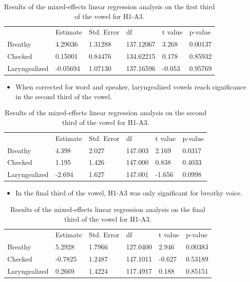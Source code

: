 \documentclass[12pt, letterpaper]{article}
\providecommand{\lsptoprule}{\midrule\toprule}
\providecommand{\lspbottomrule}{\bottomrule\midrule}
\begin{document}
\begin{table}[!h]
	\centering
	\caption{Results of the mixed-effects linear regression analysis on the first third of the vowel for H1-A3. }
	\label{tab:H1A3_First}
	 \begin{tabular}{llllll}
	  \lsptoprule
						&  Estimate  & Std. Error & df & t value & p-value \\
	  	Breathy   		&  4.29036  &  1.31288 & 137.12067 &  3.268  &  0.00137\\
		Checked    		&  0.15001  &  0.84476 & 134.62215 &  0.178  &  0.85932 \\
		Laryngealized	& -0.05694  &  1.07130 & 137.16596 & -0.053  &  0.95769\\
	  \lspbottomrule
	 \end{tabular}
\end{table}

\begin{itemize}
	\item When corrected for word and speaker, laryngealized vowels reach significance in the second third of the vowel. 
\end{itemize}

\begin{table}[!h]
	\centering
	\caption{Results of the mixed-effects linear regression analysis on the second third of the vowel for H1-A3. }
	\label{tab:H1A3_Second}
	 \begin{tabular}{llllll}
	  \lsptoprule
						&  Estimate  & Std. Error & df & t value & p-value \\
	  	Breathy   		&  4.398    &  2.027 & 147.003 &  2.169 &  0.0317 \\
		Checked    		&  1.195    &  1.426 & 147.000 &  0.838 &  0.4033  \\
		Laryngealized	& -2.694    &  1.627 & 147.001 & -1.656 &  0.0998 \\
	  \lspbottomrule
	 \end{tabular}
\end{table}

\begin{itemize}
	\item In the final third of the vowel, H1-A3 was only significant for breathy voice. 
\end{itemize}

\begin{table}[!h]
	\centering
	\caption{Results of the mixed-effects linear regression analysis on the final third of the vowel for H1-A3. }
	\label{tab:H1A3_Third}
	 \begin{tabular}{llllll}
	  \lsptoprule
						&  Estimate  & Std. Error & df & t value & p-value \\
	  	Breathy   		&  5.2928   &  1.7966 & 127.0400 &  2.946 & 0.00383 \\
		Checked    		& -0.7825   &  1.2487 & 147.1011 & -0.627 & 0.53189 \\
		Laryngealized	& 0.2669    &  1.4224 & 117.4917 &  0.188 & 0.85151 \\
	  \lspbottomrule
	 \end{tabular}
\end{table}
\end{document}
